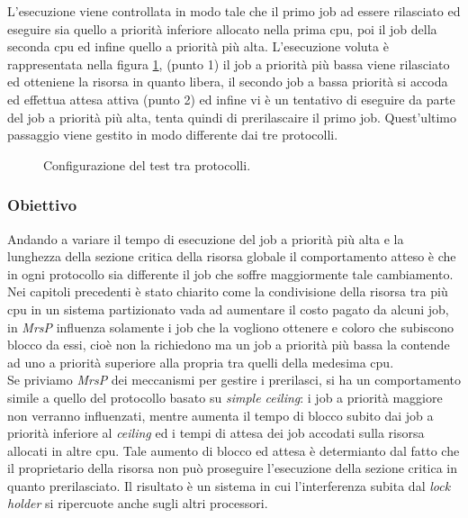 \noindent L'esecuzione viene controllata in modo tale che il primo job ad essere rilasciato ed eseguire sia quello a priorità inferiore allocato nella prima cpu, poi il job della seconda cpu ed infine quello a priorità più alta. L'esecuzione voluta è rappresentata nella figura \ref{fig:test_protocols}, (punto 1) il job a priorità più bassa viene rilasciato ed otteniene la risorsa in quanto libera, il secondo job a bassa priorità si accoda ed effettua attesa attiva (punto 2) ed infine vi è un tentativo di eseguire da parte del job a priorità più alta, tenta quindi di prerilascaire il primo job. Quest'ultimo passaggio viene gestito in modo differente dai tre protocolli.\\

\begin{figure}
\centering
{}
\caption{Configurazione del test tra protocolli.}
\label{fig:test_protocols}
\end{figure}

\subsubsection{Obiettivo}
\label{sec:confronto_protocolli_ob}

\noindent Andando a variare il tempo di esecuzione del job a priorità più alta e la lunghezza della sezione critica della risorsa globale il comportamento atteso è che in ogni protocollo sia differente il job che soffre maggiormente tale cambiamento.\\

\noindent Nei capitoli precedenti è stato chiarito come la condivisione della risorsa tra più cpu in un sistema partizionato vada ad aumentare il costo pagato da alcuni job, in \textit{MrsP} influenza solamente i job che la vogliono ottenere e coloro che subiscono blocco da essi, cioè non la richiedono ma un job a priorità più bassa la contende ad uno a priorità superiore alla propria tra quelli della medesima cpu.\\

\noindent Se priviamo \textit{MrsP} dei meccanismi per gestire i prerilasci, si ha un comportamento simile a quello del protocollo basato su \textit{simple ceiling}: i job a priorità maggiore non verranno influenzati, mentre aumenta il tempo di blocco subito dai job a priorità inferiore al \textit{ceiling} ed i tempi di attesa dei job accodati sulla risorsa allocati in altre cpu. Tale aumento di blocco ed attesa è determianto dal fatto che il proprietario della risorsa non può proseguire l'esecuzione della sezione critica in quanto prerilasciato. Il risultato è un sistema in cui l'interferenza subita dal \textit{lock holder} si ripercuote anche sugli altri processori.\\

